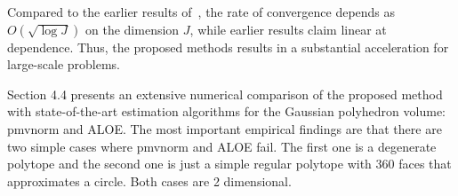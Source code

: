 Compared to the earlier results of~\cite{owen2019importance}, the rate of convergence depends as $O(\sqrt{\log J})$ on the dimension $J$, while earlier results \cite{owen2019importance} claim linear at dependence. Thus, the proposed methods results in a substantial acceleration for large-scale problems.

Section 4.4 presents an extensive numerical comparison of the proposed method with state-of-the-art estimation algorithms for the Gaussian polyhedron volume: pmvnorm and ALOE. The most important empirical findings are that there are two simple cases where pmvnorm and ALOE fail. The first one is a degenerate polytope and the second one is just a simple regular polytope with 360 faces that approximates a circle. Both cases are 2 dimensional.





